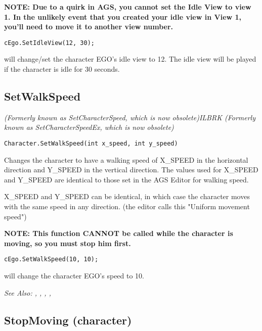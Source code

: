 \bf{NOTE:} Due to a quirk in AGS, you cannot set the Idle View to view 1. In the unlikely event that you
created your idle view in View 1, you'll need to move it to another view number.

\begin{verbatim}
cEgo.SetIdleView(12, 30);
\end{verbatim}
will change/set the character EGO's idle view to 12. The idle view will be
played if the character is idle for 30 seconds.


\subsection{SetWalkSpeed}\label{Character.SetWalkSpeed}%

\it{(Formerly known as SetCharacterSpeed, which is now obsolete)}ILBRK
\it{(Formerly known as SetCharacterSpeedEx, which is now obsolete)}

\begin{verbatim}
Character.SetWalkSpeed(int x_speed, int y_speed)
\end{verbatim}

Changes the character to have a walking speed of X_SPEED in the horizontal direction
and Y_SPEED in the vertical direction. The values used for X_SPEED and Y_SPEED are
identical to those set in the AGS Editor for walking speed.

X_SPEED and Y_SPEED can be identical, in which case the character moves with the same
speed in any direction. (the editor calls this "Uniform movement speed")

\bf{NOTE:} This function CANNOT be called while the character is moving, so
you must stop him first.

\begin{verbatim}
cEgo.SetWalkSpeed(10, 10);
\end{verbatim}
will change the character EGO's speed to 10.

\it{See Also:} ,
,
,
,



\subsection{StopMoving (character)}\label{Character.StopMoving}%

